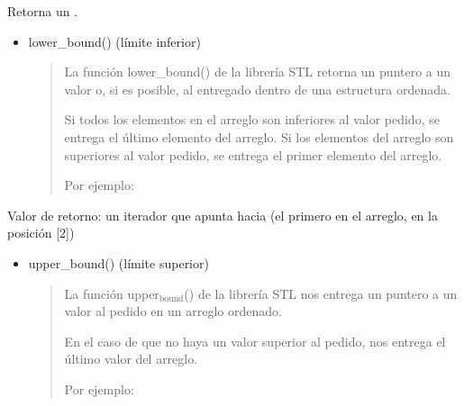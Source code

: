 \documentclass[letterpaper,10pt,spanish]{sphinxmanual}
\begin{document}
Retorna un .
\begin{itemize}
\item {} 
lower\_bound() (límite inferior)
\begin{quote}

La función lower\_bound() de la librería STL retorna un puntero a un valor  o, si es posible,  al entregado dentro de una estructura ordenada.

Si todos los elementos en el arreglo son inferiores al valor pedido, se entrega el último elemento del arreglo. Si los elementos del arreglo son superiores al valor pedido, se entrega el primer elemento del arreglo.

Por ejemplo:
\end{quote}

\end{itemize}

\begin{sphinxVerbatim}[commandchars=\\\{\},numbers=left,firstnumber=1,stepnumber=1]
         
  
\end{sphinxVerbatim}

Valor de retorno: un iterador que apunta hacia  (el primero en el arreglo, en la posición {[}2{]})
\begin{itemize}
\item {} 
upper\_bound() (límite superior)
\begin{quote}

La función upper$_{\text{bound}}$() de la librería STL nos entrega un puntero a un valor  al pedido en un arreglo ordenado.

En el caso de que no haya un valor superior al pedido, nos entrega el último valor del arreglo.

Por ejemplo:
\end{quote}

\end{itemize}
\end{document}
